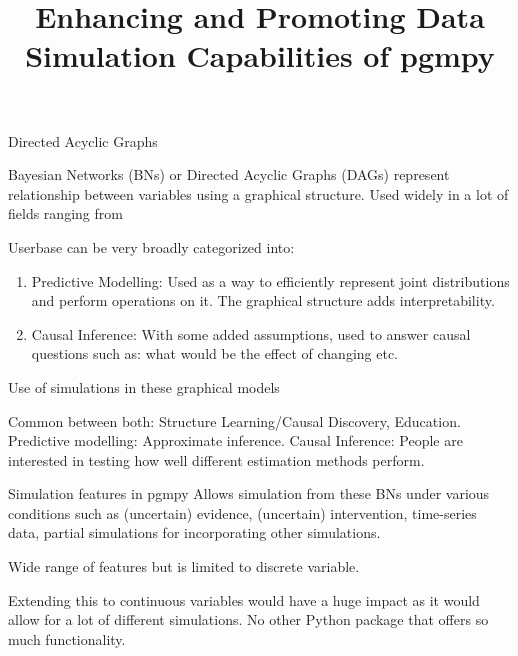 \documentclass{beamer}
\title[]{Enhancing and Promoting Data Simulation Capabilities of pgmpy}
\date{}
\begin{document}
\maketitle

\begin{frame}{Directed Acyclic Graphs}


Bayesian Networks (BNs) or Directed Acyclic Graphs (DAGs) represent relationship between variables using a graphical structure. Used widely in a lot of fields ranging from %

Userbase can be very broadly categorized into: 
\begin{enumerate}
	\item Predictive Modelling: Used as a way to efficiently represent
		joint distributions and perform operations on it. The graphical
		structure adds interpretability.
	\item Causal Inference: With some added assumptions, used to answer
		causal questions such as: what would be the effect of changing etc.
\end{enumerate}

\end{frame}

\begin{frame}{Use of simulations in these graphical models}

Common between both: Structure Learning/Causal Discovery, Education.
Predictive modelling: Approximate inference.
Causal Inference: People are interested in testing how well different estimation methods perform.
\end{frame}

\begin{frame}{Simulation features in pgmpy}
	Allows simulation from these BNs under various conditions such as (uncertain) evidence, (uncertain) intervention, time-series data, partial simulations for incorporating other simulations.

	Wide range of features but is limited to discrete variable.

	Extending this to continuous variables would have a huge impact as it would allow for 
	a lot of different simulations. No other Python package that offers so much functionality.
\end{frame}
\end{document}
